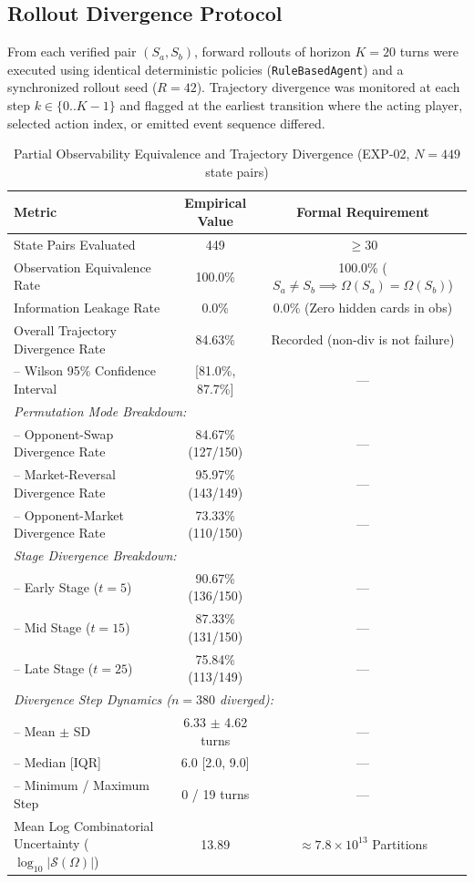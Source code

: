 \documentclass[11pt]{article}
\begin{document}
\subsection{Rollout Divergence Protocol}
From each verified pair $(S_a, S_b)$, forward rollouts of horizon $K = 20$ turns were executed using identical deterministic policies (\texttt{RuleBasedAgent}) and a synchronized rollout seed ($R = 42$). Trajectory divergence was monitored at each step $k \in \{0..K-1\}$ and flagged at the earliest transition where the acting player, selected action index, or emitted event sequence differed.




\begin{table}[htbp]
\centering
\caption{Partial Observability Equivalence and Trajectory Divergence (EXP-02, $N = 449$ state pairs)}
\label{tab:exp02_partial_observability}
\small
\begin{tabular}{lcc}
\toprule
\textbf{Metric} & \textbf{Empirical Value} & \textbf{Formal Requirement} \\
\midrule
State Pairs Evaluated & 449 & $\ge 30$ \\
Observation Equivalence Rate & 100.0\% & 100.0\% ($S_a \ne S_b \implies \Omega(S_a) = \Omega(S_b)$) \\
Information Leakage Rate & 0.0\% & 0.0\% (Zero hidden cards in obs) \\
Overall Trajectory Divergence Rate & 84.63\% & Recorded (non-div is not failure) \\
\quad -- Wilson 95\% Confidence Interval & [81.0\%, 87.7\%] & --- \\
\midrule
\multicolumn{3}{l}{\textit{Permutation Mode Breakdown:}} \\
\quad -- Opponent-Swap Divergence Rate & 84.67\% (127/150) & --- \\
\quad -- Market-Reversal Divergence Rate & 95.97\% (143/149) & --- \\
\quad -- Opponent-Market Divergence Rate & 73.33\% (110/150) & --- \\
\midrule
\multicolumn{3}{l}{\textit{Stage Divergence Breakdown:}} \\
\quad -- Early Stage ($t = 5$) & 90.67\% (136/150) & --- \\
\quad -- Mid Stage ($t = 15$) & 87.33\% (131/150) & --- \\
\quad -- Late Stage ($t = 25$) & 75.84\% (113/149) & --- \\
\midrule
\multicolumn{3}{l}{\textit{Divergence Step Dynamics ($n = 380$ diverged):}} \\
\quad -- Mean $\pm$ SD & 6.33 $\pm$ 4.62 turns & --- \\
\quad -- Median [IQR] & 6.0 [2.0, 9.0] & --- \\
\quad -- Minimum / Maximum Step & 0 / 19 turns & --- \\
\midrule
Mean Log Combinatorial Uncertainty ($\log_{10} |\mathcal{S}(\Omega)|$) & 13.89 & $\approx 7.8 \times 10^{13}$ Partitions \\
\bottomrule
\end{tabular}
\end{table}
\end{document}
